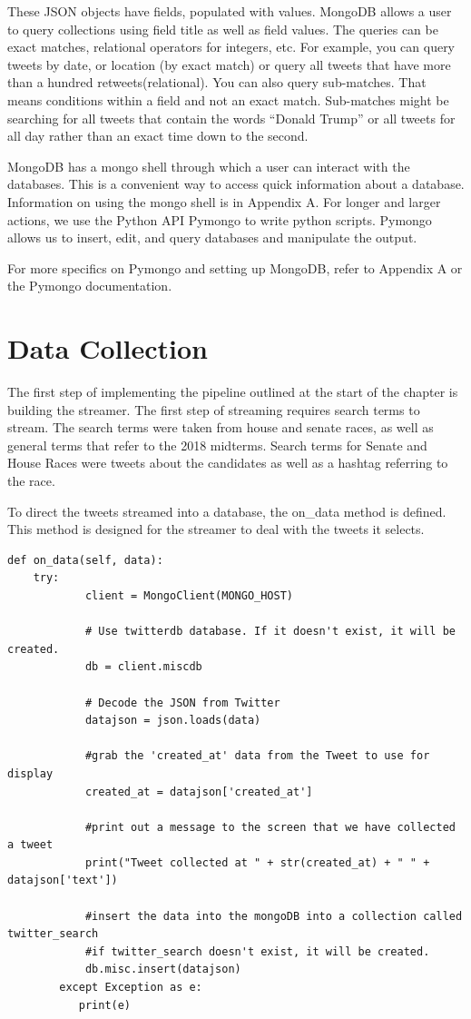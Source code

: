 \documentclass[11pt, twoside, reqno]{article}
\begin{document}
These JSON objects have fields, populated with values. MongoDB allows a user to query collections using field title as well as field values. The queries can be exact matches, relational operators for integers, etc. For example, you can query tweets by date, or location (by exact match) or query all tweets that have more than a hundred retweets(relational). You can also query sub-matches. That means conditions within a field and not an exact match. Sub-matches might be searching for all tweets that contain the words ``Donald Trump'' or all tweets for all day rather than an exact time down to the second. 

MongoDB has a mongo shell through which a user can interact with the databases. This is a convenient way to access quick information about a database. Information on using the mongo shell is in Appendix A. For longer and larger actions, we use the Python API Pymongo to write python scripts. Pymongo allows us to insert, edit, and query databases and manipulate the output. 

For more specifics on Pymongo and setting up MongoDB, refer to Appendix A or the Pymongo documentation.

\section{Data Collection}
\hspace{0.2in} 
The first step of implementing the pipeline outlined at the start of the chapter is building the streamer. The first step of streaming requires search terms to stream. The search terms were taken from house and senate races, as well as general terms that refer to the 2018 midterms. Search terms for Senate and House Races were tweets about the candidates as well as a hashtag referring to the race. 

To direct the tweets streamed into a database, the on\_data method is defined. This method is designed for the streamer to deal with the tweets it selects.

\begin{verbatim}
def on_data(self, data):
	try:
            client = MongoClient(MONGO_HOST)

            # Use twitterdb database. If it doesn't exist, it will be created.
            db = client.miscdb

            # Decode the JSON from Twitter
            datajson = json.loads(data)

            #grab the 'created_at' data from the Tweet to use for display
            created_at = datajson['created_at']

            #print out a message to the screen that we have collected a tweet
            print("Tweet collected at " + str(created_at) + " " + datajson['text'])

            #insert the data into the mongoDB into a collection called twitter_search
            #if twitter_search doesn't exist, it will be created.
            db.misc.insert(datajson)
        except Exception as e:
           print(e)
\end{verbatim}
\end{document}
